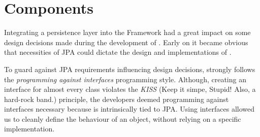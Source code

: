 \chapter{\salespoint{} Components}
\label{chap:components}
Integrating a persistence layer into the \salespoint{} Framework had a great impact on some design decisions made during the development of \salespoint{}.
Early on it became obvious that necessities of JPA could dictate the design and implementations of \salespoint{}.

To guard against JPA requirements influencing design decisions, \salespoint{} strongly follows the \textit{programming against interfaces} programming style.
Although, creating an interface for almost every class violates the \textit{KISS} (Keep it simpe, Stupid! Also, a hard-rock band.) principle, the developers deemed programming against interfaces necessary because \salespoint{} is intrinsically tied to JPA.
Using interfaces allowed us to cleanly define the behaviour of an object, without relying on a specific implementation.
\\

